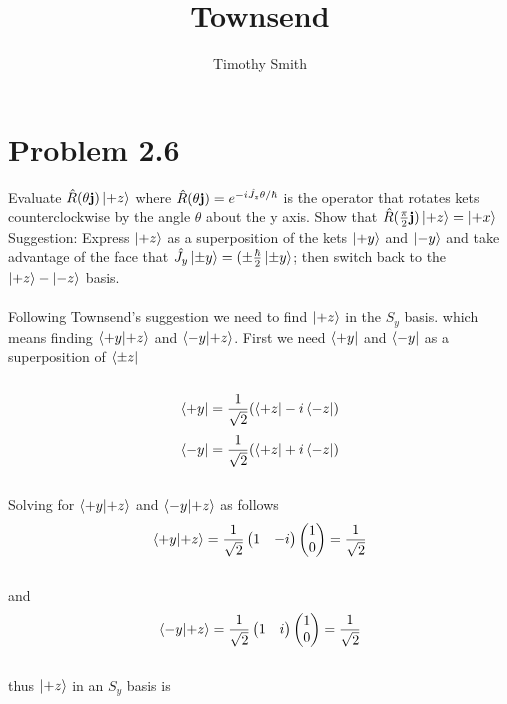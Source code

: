 \documentclass{article}
\begin{document}
\author{Timothy Smith}
\title{Townsend}
\maketitle

\section*{Problem 2.6}
Evaluate $\hat{R} (\theta \vb{j})\ket{+z}$ where $\hat{R} (\theta \vb{j})= e^{-i\hat{J_z}\theta/\hbar}$ is the operator that rotates kets counterclockwise by the angle $\theta$ about the y axis. Show that $\hat{R} (\frac{\pi}{2} \vb{j})\ket{+z} = \ket{+x}$ Suggestion: Express $\ket{+z} $ as a superposition of the kets $\ket{+y} $ and $\ket{-y}$ and take advantage of the face that $\hat{J_y}\ket{\pm y}=(\pm \frac{\hbar}{2}\ket{\pm y}$; then switch back to the $\ket{+z}-\ket{-z}$ basis. 
\\
\\
Following Townsend's suggestion we need to find  $\ket{+z}$ in the $S_y$ basis. which means finding 
$\braket{+y}{+z}$ and $\braket{-y}{+z}$.
First we need $\bra{+y}$ and $\bra{-y}$ as a superposition of $\bra{\pm z}$
\\
\\
$$ \bra{+y}=\frac{1}{\sqrt{2}}(\bra{+z}-i\bra{-z})$$
$$ \bra{-y}=\frac{1}{\sqrt{2}}(\bra{+z}+i\bra{-z})$$
\\
Solving for $\braket{+y}{+z}$ and $\braket{-y}{+z}$ as follows
\begin{equation}
\braket{+y}{+z}
=
\frac{1}{\sqrt{2}} 
\begin{pmatrix}
1  & -i
\end{pmatrix}
\begin{pmatrix}
1  \\
0
\end{pmatrix}
=\frac{1}{\sqrt{2}}
\end{equation}
\\
and
\\
\begin{equation}
\braket{-y}{+z}
=
\frac{1}{\sqrt{2}} 
\begin{pmatrix}
1  & i
\end{pmatrix}
\begin{pmatrix}
1  \\
0
\end{pmatrix}
=\frac{1}{\sqrt{2}}
\end{equation}
\\
thus $ \ket{+z}$ in an $S_y$ basis is 
\end{document}
